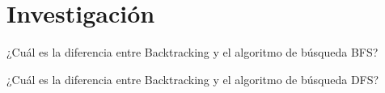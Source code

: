 \section{Investigación} 


\begin{center}
    ¿Cuál es la diferencia entre Backtracking y el algoritmo de búsqueda BFS?
\end{center}





\begin{center}
    ¿Cuál es la diferencia entre Backtracking y el algoritmo de búsqueda DFS?
\end{center}
